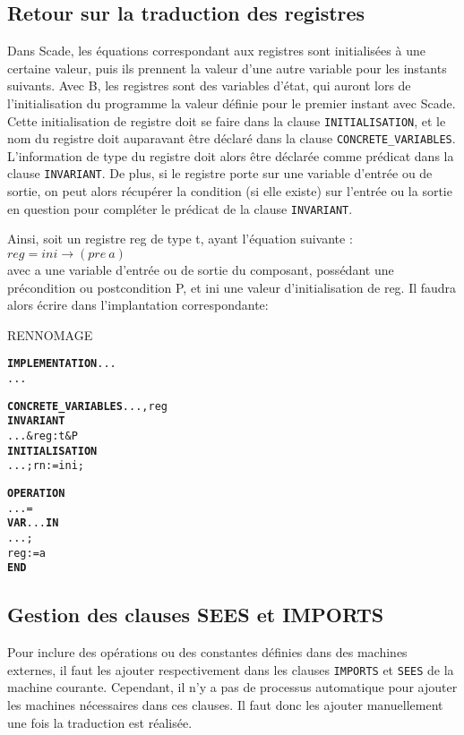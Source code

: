 \subsection{Retour sur la traduction des registres}
Dans Scade, les équations correspondant aux registres sont initialisées à une
certaine valeur, puis ils prennent la valeur d'une autre variable pour les
instants suivants. Avec B, les registres sont des variables
d'état, qui auront lors de l'initialisation du programme la valeur définie pour
le premier instant avec Scade.
Cette initialisation de registre doit se faire dans la clause \texttt{INITIALISATION}, et
le nom du registre doit auparavant être déclaré dans la clause \texttt{CONCRETE\_VARIABLES}. L'information de
type du registre doit alors être déclarée comme prédicat dans la clause
\texttt{INVARIANT}. De plus, si le registre porte sur une variable d'entrée ou de sortie,
on peut alors récupérer la condition (si elle existe) sur l'entrée ou la sortie
en question pour compléter le prédicat de la clause \texttt{INVARIANT}. 

Ainsi, soit un registre reg de type t, ayant l'équation suivante :\\
$reg = ini \rightarrow (pre ~a)$ \\
avec a une variable d'entrée ou de sortie du composant, possédant une
précondition ou postcondition P, et ini une valeur d'initialisation de
reg. Il faudra alors écrire dans l'implantation correspondante: 

RENNOMAGE

\begin{alltt}
\textbf{IMPLEMENTATION} ...
...

\textbf{CONCRETE\_VARIABLES} ..., reg
\textbf{INVARIANT}
  ...& reg : t & P
\textbf{INITIALISATION}
  ... ; rn := ini;

\textbf{OPERATION}
... =
\textbf{VAR} ... \textbf{IN}
  ...;
  reg := a
\textbf{END}
\end{alltt}

\subsection{Gestion des clauses SEES et IMPORTS}
Pour inclure des opérations ou des constantes définies dans des machines
externes, il faut les ajouter respectivement dans les clauses \texttt{IMPORTS} et \texttt{SEES} de
la machine courante. Cependant, il n'y a pas de processus automatique pour
ajouter les machines nécessaires dans ces clauses. Il faut donc les ajouter
manuellement une fois la traduction est réalisée.


